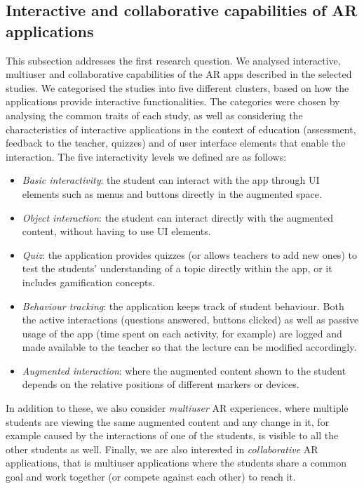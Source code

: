\subsection{Interactive and collaborative capabilities of AR applications}

This subsection addresses the first research question. We analysed interactive, multiuser and collaborative capabilities of the \gls{AR} apps described in the selected studies. We categorised the studies into five different clusters, based on how the applications provide interactive functionalities. The categories were chosen by analysing the common traits of each study, as well as considering the characteristics of interactive applications in the context of education (assessment, feedback to the teacher, quizzes) and of user interface elements that enable the interaction.  The five interactivity levels we defined are as follows:

\begin{itemize}
    \item \emph{Basic interactivity}: the student can interact with the app through \gls{UI} elements such as menus and buttons directly in the augmented space.
    \item \emph{Object interaction}: the student can interact directly with the augmented content, without having to use \gls{UI} elements.
    \item \emph{Quiz}: the application provides quizzes (or allows teachers to add new ones) to test the students' understanding of a topic directly within the app, or it includes gamification concepts.
    \item \emph{Behaviour tracking}: the application keeps track of student behaviour. Both the active interactions (questions answered, buttons clicked) as well as passive usage of the app (time spent on each activity, for example) are logged and made available to the teacher so that the lecture can be modified accordingly.
    \item \emph{Augmented interaction}: where the augmented content shown to the student depends on the relative positions of different markers or devices.
\end{itemize}

In addition to these, we also consider \emph{multiuser} \gls{AR} experiences, where multiple students are viewing the same augmented content and any change in it, for example caused by the interactions of one of the students, is visible to all the other students as well.
Finally, we are also interested in \emph{collaborative} \gls{AR} applications, that is multiuser applications where the students share a common goal and work together (or compete against each other) to reach it.

